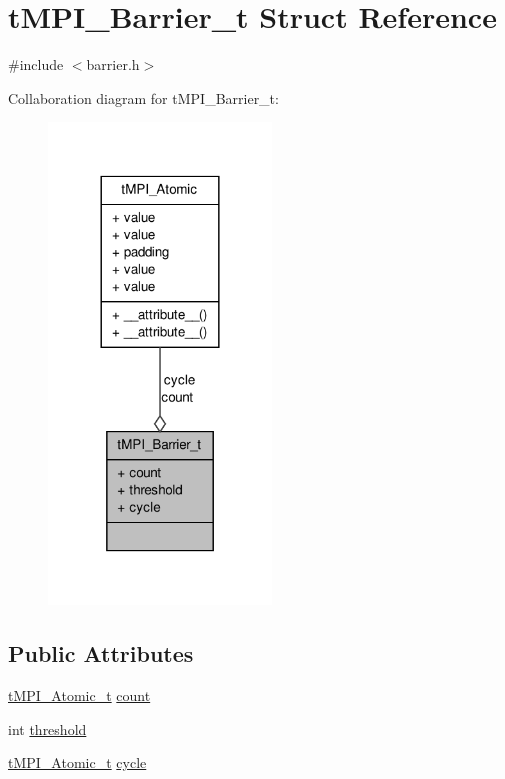 \hypertarget{structtMPI__Barrier__t}{\section{t\-M\-P\-I\-\_\-\-Barrier\-\_\-t \-Struct \-Reference}
\label{structtMPI__Barrier__t}
}


{\ttfamily \#include $<$barrier.\-h$>$}



\-Collaboration diagram for t\-M\-P\-I\-\_\-\-Barrier\-\_\-t\-:
\nopagebreak
\begin{figure}[H]
\begin{center}
\leavevmode
\includegraphics[width=168pt]{structtMPI__Barrier__t__coll__graph}
\end{center}
\end{figure}
\subsection*{\-Public \-Attributes}
\begin{DoxyCompactItemize}
\item 
\hyperlink{include_2thread__mpi_2atomic_2gcc_8h_a2c33794dc540e3b07cffc1f81a3fe4b4}{t\-M\-P\-I\-\_\-\-Atomic\-\_\-t} \hyperlink{structtMPI__Barrier__t_af2e5f903850086a31609f10552f6662f}{count}
\item 
int \hyperlink{structtMPI__Barrier__t_a30fa9e282d85bab5a124d36e1867f857}{threshold}
\item 
\hyperlink{include_2thread__mpi_2atomic_2gcc_8h_a2c33794dc540e3b07cffc1f81a3fe4b4}{t\-M\-P\-I\-\_\-\-Atomic\-\_\-t} \hyperlink{structtMPI__Barrier__t_a4568bebd0b91f6e154a5f9ddd6ddf734}{cycle}
\end{DoxyCompactItemize}


